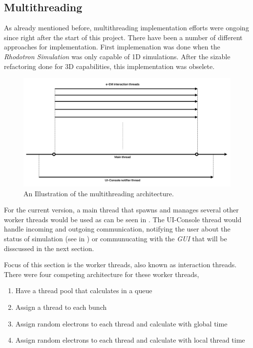 \documentclass[a4paper,oneside,12pt]{report}
\numberwithin{equation}{chapter}
\begin{document}
\subsection{Multithreading}
As already mentioned before, multithreading implementation efforts were ongoing since right after the start of this project. 
There have been a number of different approaches for implementation. 
First implemenation was done when the \textit{Rhodotron Simulation} was only capable of 1D simulations.
After the sizable refactoring done for 3D capabilities, this implementation was obselete. 

\begin{figure}[H]
    \centering
    \includegraphics[width=\linewidth]{./figures/illustrations/multh_arc.png}
    \caption{An Illustration of the multithreading architecture.}
    \label{fig:multh_illustration}
\end{figure}

For the current version, a main thread that spawns and manages several other worker threads would be used as can be seen in .
The UI-Console thread would handle incoming and outgoing communication, notifying the user about the status of simulation (see  in ) 
or communucating with the \textit{GUI} that will be disscussed in the next section.

Focus of this section is the worker threads, also known as \eEM interaction threads.
There were four competing architecture for these worker threads,
\begin{enumerate}
    \item Have a thread pool that calculates \eEM in a queue 
    \item Assign a thread to each bunch
    \item Assign random electrons to each thread and calculate \eEM with global time
    \item Assign random electrons to each thread and calculate \eEM with local thread time
\end{enumerate}
\end{document}
